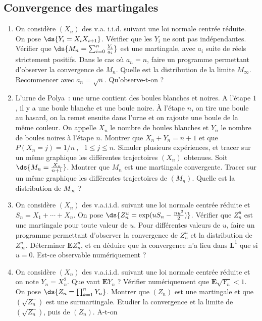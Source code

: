 %
\subsection{Convergence des martingales}
%

\begin{enumerate}
\item On considère $(X_n)$ des v.a. i.i.d. suivant une loi normale centrée 
  réduite. On pose $\ds{Y_i=X_iX_{i+1}}$. Vérifier que les $Y_i$ ne sont pas
  indépendantes. Vérifier que $\ds{M_n=\sum _{i=0}^n\frac{Y_i}{a_i}}$
  est une martingale, avec $a_i$ suite de réels strictement positifs. Dans le
  cas où $a_n=n$, faire un programme permettant d'observer la convergence de
  $M_n$. Quelle est la distribution de la limite $M_{\infty}$. Recommencer avec
  $a_n=\sqrt{n}$. Qu'observe-t-on ?
\item L'urne de Polya~: une urne contient des boules blanches et noires. A
  l'étape $1$, il y a une boule blanche et une boule noire. À l'étape $n$,
  on tire une boule au hasard, on la remet ensuite dans l'urne et on rajoute
  une boule de la même couleur. On appelle $X_n$ le nombre de boules
  blanches et $Y_n$ le nombre de boules noires à l'étape $n$. Montrer que
  $X_n + Y_n = n+1$ et que $P(X_n=j)=1/n \ , \ \ \ 1\leq j \leq n.$ Simuler
  plusieurs expériences, et tracer sur un même graphique les différentes
  trajectoires $(X_n)$ obtenues. Soit $\ds{M_n=\frac {X_n}{n+1}}$.
  Montrer que $M_n$ est une martingale convergente. Tracer sur un même
  graphique les différentes trajectoires de $(M_n)$. Quelle est la
  distribution de $M_{\infty}$ ?
\item On considère $(X_n)$ des v.a.i.i.d. suivant une loi normale centrée
  réduite et $S_n=X_1+\cdots+X_n$. On pose
  $\ds{Z_n^u=\exp(uS_n-\frac{nu^2}2)}$. Vérifier que $Z_n^u$ est une
  martingale pour toute valeur de $u$. Pour différentes valeurs de $u$, faire
  un programme permettant d'observer la convergence de $Z_n^u$ et la
  distribution de $Z_\infty^u$. Déterminer $\mathbf{E} Z_n^u$, et en déduire
  que la convergence n'a lieu dans $\mathbf{L}^1$ que si $u=0$. Est-ce
  observable numériquement ?
\item On considère $(X_n)$ des v.a.i.i.d. suivant une loi normale centrée
  réduite et on note $Y_n=X_n^2$. Que vaut $\mathbf{E} Y_n$ ? Vérifier
  numériquement que $\mathbf{E} \sqrt{Y_n}<1$. On pose
  $\ds{Z_n=\prod _{k=1}^n Y_n}$.  Montrer que $(Z_n)$ est une
  martingale et que $(\sqrt{Z_n})$ est une surmartingale. Etudier la
  convergence et la limite de $(\sqrt{Z_n})$, puis de $(Z_n)$. A-t-on

\end{enumerate}
